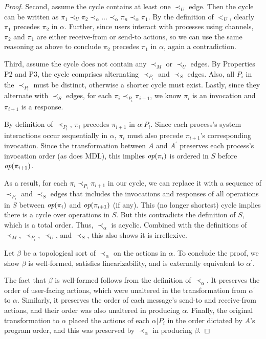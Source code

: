 \begin{proof}
Second, assume the cycle contains at least one $\prec_U$ edge. Then the cycle can be
written as
$\pi_1 \prec_U \pi_2 \prec_{\alpha} \ldots \prec_{\alpha} \pi_n \prec_{\alpha} \pi_1$. By the definition of $<_U$, clearly $\pi_1$ precedes $\pi_2$ in $\alpha$.
Further, since users interact with processes using channels, $\pi_2$ and
$\pi_1$ are either receive-from or send-to actions, so we can use the same
reasoning as above to conclude $\pi_2$ precedes $\pi_1$ in $\alpha$, again a
contradiction. 

Third, assume the cycle does not contain any $\prec_M$ or $\prec_U$ edges.
By Properties P2 and P3, the cycle comprises alternating
$\prec_{P_i}$ and $\prec_S$ edges. Also, all $P_i$ in the $\prec_{P_i}$
must be distinct, otherwise a shorter cycle must exist.
Lastly, since they alternate with $\prec_S$ edges,
for each $\pi_i \prec_{P_i} \pi_{i+1}$, we know 
$\pi_i$ is an invocation and $\pi_{i+1}$ is a response.

By definition of $\prec_{P_i}$, $\pi_i$ precedes $\pi_{i+1}$ in $\alpha | P_i$.
Since each process’s system interactions occur sequentially in $\alpha$,
$\pi_{i}$ must also precede $\pi_{i+1}$'s corresponding invocation.
Since the transformation between $A$ and $A^\prime$ preserves each process’s
invocation order (as does MDL), this implies $\operatorname*{\textit{op}}(\pi_{i})$ is ordered in $S$
before $\operatorname*{\textit{op}}(\pi_{i+1})$.

As a result, for each $\pi_i \prec_{P_i} \pi_{i+1}$ in our cycle, we can replace it
with a sequence of $\prec_{P_i}$ and $\prec_S$ edges that includes the invocations 
and responses of all operations in $S$ between $\operatorname*{\textit{op}}(\pi_i)$ and $\operatorname*{\textit{op}}(\pi_{i+1})$
(if any). This (no longer shortest) cycle implies there is a cycle over operations 
in $S$. But this contradicts the definition of $S$, which is a 
total order. Thus, $\prec_{\alpha}$ is acyclic. Combined with the
definitions of $\prec_M$, $\prec_{P_i}$, $\prec_U$, and $\prec_S$, this also
shows it is irreflexive.

Let $\beta$ be a topological sort of $\prec_{\alpha}$ on the actions in
$\alpha$. To conclude the proof, we show $\beta$ is well-formed,
satisfies linearizability, and is externally equivalent to $\alpha^\prime$.

The fact that $\beta$ is well-formed follows from the definition of
$\prec_{\alpha}$. It preserves the order of user-facing actions,
which were unaltered in the transformation from $\alpha^\prime$ to $\alpha$.
Similarly, it preserves the order of each message's send-to and receive-from actions,
and their order was also unaltered in producing $\alpha$. Finally, the original
transformation to $\alpha$ placed the actions of each $\alpha | P_i$ in
the order dictated by $A$'s program order, and this was preserved by
$\prec_{\alpha}$ in producing $\beta$.


\end{proof}
